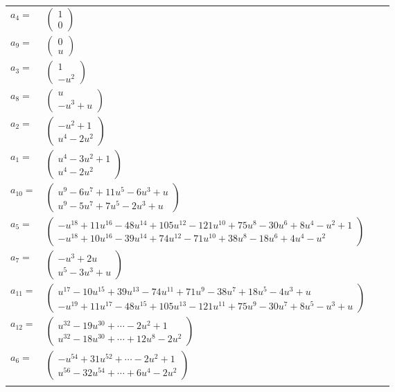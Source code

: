 \documentclass[1p]{elsarticle_modified}
\theoremstyle{definition}
\begin{document}
\begin{tabular}{m{7pt} m{180pt} m{7pt} m{180pt} }
\flushright $a_{4}=$&$\begin{pmatrix}1\\0\end{pmatrix}$ \\
\flushright $a_{9}=$&$\begin{pmatrix}0\\u\end{pmatrix}$ \\
\flushright $a_{3}=$&$\begin{pmatrix}1\\- u^2\end{pmatrix}$ \\
\flushright $a_{8}=$&$\begin{pmatrix}u\\- u^3+u\end{pmatrix}$ \\
\flushright $a_{2}=$&$\begin{pmatrix}- u^2+1\\u^4-2 u^2\end{pmatrix}$ \\
\flushright $a_{1}=$&$\begin{pmatrix}u^4-3 u^2+1\\u^4-2 u^2\end{pmatrix}$ \\
\flushright $a_{10}=$&$\begin{pmatrix}u^9-6 u^7+11 u^5-6 u^3+u\\u^9-5 u^7+7 u^5-2 u^3+u\end{pmatrix}$ \\
\flushright $a_{5}=$&$\begin{pmatrix}- u^{18}+11 u^{16}-48 u^{14}+105 u^{12}-121 u^{10}+75 u^8-30 u^6+8 u^4- u^2+1\\- u^{18}+10 u^{16}-39 u^{14}+74 u^{12}-71 u^{10}+38 u^8-18 u^6+4 u^4- u^2\end{pmatrix}$ \\
\flushright $a_{7}=$&$\begin{pmatrix}- u^3+2 u\\u^5-3 u^3+u\end{pmatrix}$ \\
\flushright $a_{11}=$&$\begin{pmatrix}u^{17}-10 u^{15}+39 u^{13}-74 u^{11}+71 u^9-38 u^7+18 u^5-4 u^3+u\\- u^{19}+11 u^{17}-48 u^{15}+105 u^{13}-121 u^{11}+75 u^9-30 u^7+8 u^5- u^3+u\end{pmatrix}$ \\
\flushright $a_{12}=$&$\begin{pmatrix}u^{32}-19 u^{30}+\cdots-2 u^2+1\\u^{32}-18 u^{30}+\cdots+12 u^8-2 u^2\end{pmatrix}$ \\
\flushright $a_{6}=$&$\begin{pmatrix}- u^{54}+31 u^{52}+\cdots-2 u^2+1\\u^{56}-32 u^{54}+\cdots+6 u^4-2 u^2\end{pmatrix}$\\&\end{tabular}
\end{document}
